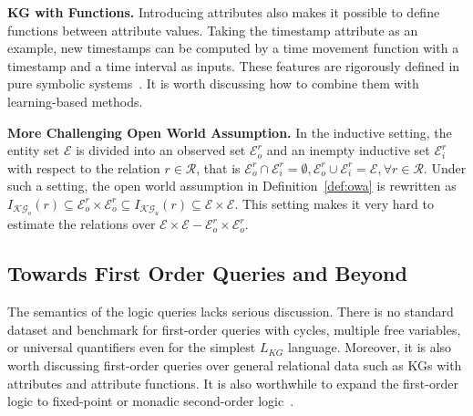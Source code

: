 \documentclass[11pt]{article}
\newcommand{\entity}{\mathcal{E}}
\newcommand{\relation}{\mathcal{R}}
\newcommand{\lang}{\mathcal{L}}
\newcommand{\kgnew}{\mathcal{KG}}
\begin{document}
\noindent\textbf{KG with Functions.} Introducing attributes also makes it possible to define functions between attribute values. Taking the timestamp attribute as an example, new timestamps can be computed by a time movement function with a timestamp and a time interval as inputs. These features are rigorously defined in pure symbolic systems~\cite{emerson1990temporal}. It is worth discussing how to combine them with learning-based methods.

\noindent\textbf{More Challenging Open World Assumption.}  In the inductive setting, the entity set $\entity$ is divided into an observed set $\entity_o^r$ and an inempty inductive set $\entity_i^r$ with respect to the relation $r\in \relation$, that is $\entity_o^r\cap\entity_i^r = \emptyset, \entity_o^r\cup\entity_i^r = \entity, \forall r\in\relation$. Under such a setting, the open world assumption in Definition~\ref{def:owa} is rewritten as $I_{\kgnew_o}(r) \subseteq \entity_o^r\times \entity_o^r \subseteq I_{\kgnew_u}(r) \subseteq \entity\times \entity$. This setting makes it very hard to estimate the relations over $\entity\times \entity - \entity_o^r\times \entity_o^r $.

\subsection{Towards First Order Queries and Beyond}
The semantics of the logic queries lacks serious discussion. There is no standard dataset and benchmark for first-order queries with cycles, multiple free variables, or universal quantifiers even for the simplest $L_{KG}$ language. Moreover, it is also worth discussing first-order queries over general relational data such as KGs with attributes and attribute functions. It is also worthwhile to expand the first-order logic to fixed-point or monadic second-order logic~\cite{Libkin2004ElementsFinite}.
\end{document}
